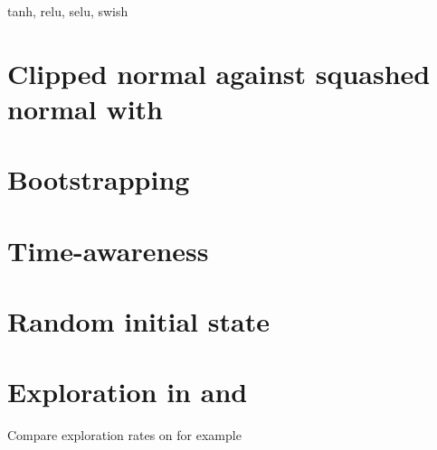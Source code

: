 tanh, relu, selu, swish

\section{Clipped normal against squashed normal with \ppo}

\section{Bootstrapping}

\section{Time-awareness}

\section{Random initial state}

\section{Exploration in \tdt and \sac}

Compare exploration rates on  for example